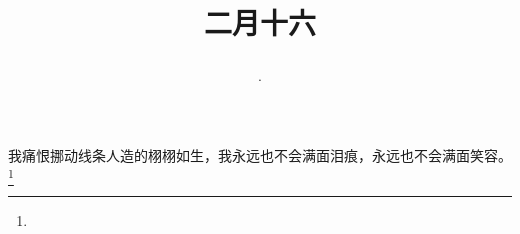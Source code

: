 \title{\date[d=25,m=3,y=2024][year:cn-y,年,month:cn,day:cn,日,·,weekday]·二月十六 }
我痛恨挪动线条人造的栩栩如生，我永远也不会满面泪痕，永远也不会满面笑容。\footnote{ }

